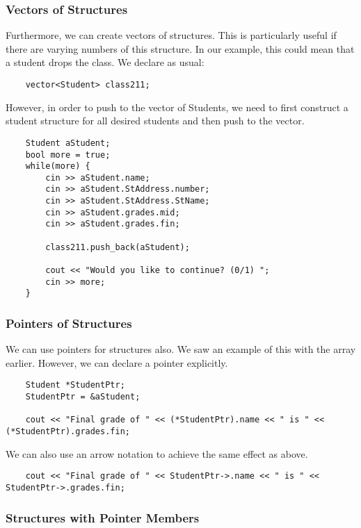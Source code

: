 \documentclass[]{article}
\begin{document}
\subsubsection{Vectors of Structures}
\bigbreak

Furthermore, we can create vectors of structures. This is particularly useful if there are varying numbers of this structure. In our example, this could mean that a student drops the class. We declare as usual:

\begin{lstlisting}
	vector<Student> class211;
\end{lstlisting}\bigbreak

However, in order to push to the vector of Students, we need to first construct a student structure for all desired students and then push to the vector.

\begin{lstlisting}
	Student aStudent;
	bool more = true;
	while(more) {
		cin >> aStudent.name;
		cin >> aStudent.StAddress.number;
		cin >> aStudent.StAddress.StName;
		cin >> aStudent.grades.mid;
		cin >> aStudent.grades.fin;
		
		class211.push_back(aStudent);
		
		cout << "Would you like to continue? (0/1) ";
		cin >> more;
	}
\end{lstlisting}\bigbreak


\subsubsection{Pointers of Structures}
\bigbreak

We can use pointers for structures also. We saw an example of this with the array earlier. However, we can declare a pointer explicitly. 

\begin{lstlisting}
	Student *StudentPtr;
	StudentPtr = &aStudent;
	
	cout << "Final grade of " << (*StudentPtr).name << " is " << (*StudentPtr).grades.fin;
\end{lstlisting}\bigbreak

We can also use an arrow notation to achieve the same effect as above.

\begin{lstlisting}
	cout << "Final grade of " << StudentPtr->.name << " is " << StudentPtr->.grades.fin;
\end{lstlisting}\bigbreak


\subsubsection{Structures with Pointer Members}
\bigbreak
\end{document}
